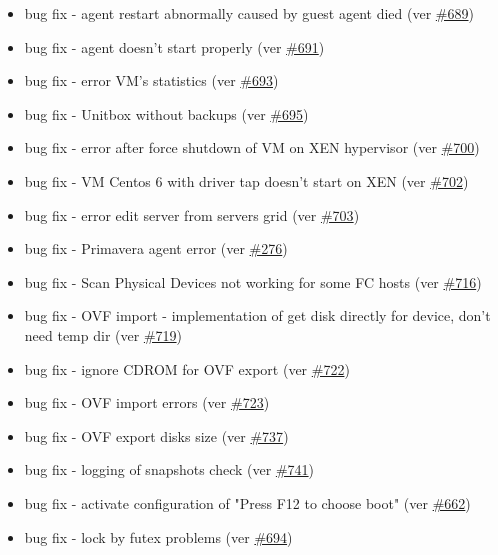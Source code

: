 \begin{itemize}
	\item bug fix - agent restart abnormally caused by guest agent died (ver \href{https://srcmaster.eurotux.com/pm/p/etva/ticket/689}{\#689})
	\item bug fix - agent doesn't start properly (ver \href{https://srcmaster.eurotux.com/pm/p/etva/ticket/691}{\#691})
	\item bug fix - error VM's statistics (ver \href{https://srcmaster.eurotux.com/pm/p/etva/ticket/693}{\#693})
	\item bug fix - Unitbox without backups (ver \href{https://srcmaster.eurotux.com/pm/p/etva/ticket/695}{\#695})
	\item bug fix - error after force shutdown of VM on XEN hypervisor (ver \href{https://srcmaster.eurotux.com/pm/p/etva/ticket/700}{\#700})
	\item bug fix - VM Centos 6 with driver tap doesn't start on XEN (ver \href{https://srcmaster.eurotux.com/pm/p/etva/ticket/702}{\#702})
	\item bug fix - error edit server from servers grid (ver \href{https://srcmaster.eurotux.com/pm/p/etva/ticket/703}{\#703})
	\item bug fix - Primavera agent error (ver \href{https://srcmaster.eurotux.com/pm/p/etva/ticket/276}{\#276})
	\item bug fix - Scan Physical Devices not working for some FC hosts (ver \href{https://srcmaster.eurotux.com/pm/p/etva/ticket/716}{\#716})
	\item bug fix - OVF import - implementation of get disk directly for device, don't need temp dir (ver \href{https://srcmaster.eurotux.com/pm/p/etva/ticket/719}{\#719})
	\item bug fix - ignore CDROM for OVF export (ver \href{https://srcmaster.eurotux.com/pm/p/etva/ticket/722}{\#722})
	\item bug fix - OVF import errors (ver \href{https://srcmaster.eurotux.com/pm/p/etva/ticket/723}{\#723})
	\item bug fix - OVF export disks size (ver \href{https://srcmaster.eurotux.com/pm/p/etva/ticket/737}{\#737})
	\item bug fix - logging of snapshots check (ver \href{https://srcmaster.eurotux.com/pm/p/etva/ticket/741}{\#741})
	\item bug fix - activate configuration of "Press F12 to choose boot" (ver \href{https://srcmaster.eurotux.com/pm/p/etva/ticket/662}{\#662})
	\item bug fix - lock by futex problems (ver \href{https://srcmaster.eurotux.com/pm/p/etva/ticket/694}{\#694})

\end{itemize}
